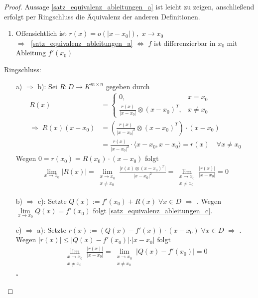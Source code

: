 \begin{proof}
	\NoEndMark
	Aussage \ref{satz_equivalenz_ableitungen_a} ist leicht zu zeigen, anschließend erfolgt per Ringschluss die Äquivalenz der anderen Definitionen.
	\begin{enumerate}[label={zu \alph*)},leftmargin=\widthof{\ zu a)\ }]
		\item Offensichtlich ist $r(x) = o(\vert x - x_0 \vert ),$ $x\to x_0$ \\
		$\Rightarrow\;$ \ref{satz_equivalenz_ableitungen_a} $\Leftrightarrow$ $f$ ist differenzierbar in $x_0$ mit Ableitung $f'(x_0)$
	\end{enumerate}
	Ringschluss:
	\begin{itemize}[leftmargin=,topsep=-5pt]
		\item[a) $\Rightarrow$ b):] Sei $R: D\to K^{m\times n}$ gegeben durch \begin{align*}
			R(x) &= \begin{cases}
				0, & x = x_0 \\
				\frac{r(x)}{\vert x - x_0\vert} \otimes (x - x_0)^T, & x\neq x_0
			\end{cases}\\
			\Rightarrow \;R(x) (x - x_0) &= \left( \frac{r(x)}{\vert x - x_0\vert^2} \otimes (x - x_0)^T \right) \cdot (x - x_0)\\
			 &= \frac{r(x)}{\vert x - x_0\vert ^2} \cdot \langle x - x_0 , x - x_0 \rangle = r(x) \quad \forall x\neq x_0
		\end{align*}
		Wegen $0 = r(x_0) = R(x_0)\cdot (x - x_0)$ folgt \begin{align*}
			\lim\limits_{x\to x_0} \vert R(x) \vert = \lim\limits_{\substack{x\to x_0 \\ x\neq x_0}} \frac{\vert r(x) \otimes (x - x_0)^T\vert }{\vert x - x_0 \vert^2} = \lim\limits_{\substack{x\to x_0 \\ x\neq x_0}} \frac{\vert r(x)\vert}{\vert x - x_0\vert} = 0
			\end{align*}
			
		\item[b) $\Rightarrow$ c):] Setzte $Q(x) := f'(x_0) + R(x) \; \forall x\in D$ $\Rightarrow$ . Wegen $\lim\limits_{x\to x_0} Q(x) = f'(x_0)$ folgt \ref{satz_equivalenz_ableitungen_c}.
			
		\item[c) $\Rightarrow$ a):] Setzte $r(x) := (Q(x) - f'(x))\cdot (x - x_0) \;\forall x\in D$ $\Rightarrow$ . Wegen $\vert r(x) \vert \le \vert Q(x) - f'(x_0) \vert \cdot \vert x - x_0 \vert $ folgt \zeroAmsmathAlignVSpaces \begin{align*}
			\lim\limits_{\substack{x\to x_0 \\ x\neq x_0}} \frac{\vert r(x) \vert}{\vert x - x_0 \vert} =  \lim\limits_{\substack{x\to x_0 \\ x\neq x_0}} \vert Q(x) - f'(x_0) \vert = 0
		\end{align*}
		\hfill$\square$
	\end{itemize}
\end{proof}

